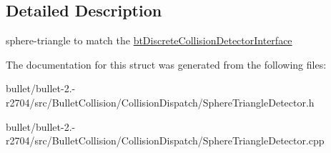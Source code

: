 \subsection{Detailed Description}
sphere-\/triangle to match the \hyperlink{structbt_discrete_collision_detector_interface}{bt\+Discrete\+Collision\+Detector\+Interface} 

The documentation for this struct was generated from the following files\+:\begin{DoxyCompactItemize}
\item 
bullet/bullet-\/2.-\/r2704/src/\+Bullet\+Collision/\+Collision\+Dispatch/Sphere\+Triangle\+Detector.\+h\item 
bullet/bullet-\/2.-\/r2704/src/\+Bullet\+Collision/\+Collision\+Dispatch/Sphere\+Triangle\+Detector.\+cpp\end{DoxyCompactItemize}
